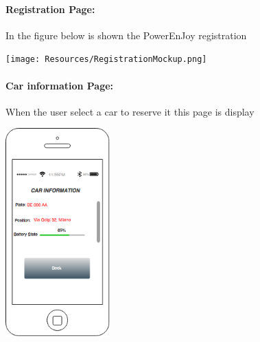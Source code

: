 \paragraph{Registration Page:}
	In the figure below is shown the PowerEnJoy registration
\begin{center}
	\texttt{[image: Resources/RegistrationMockup.png]}
\end{center}

\vfill
\paragraph{Car information Page:}
	When the user select a car to reserve it this page is display
\begin{center}
	\includegraphics[height=8cm]{Resources/CarInfo.png}
\end{center}